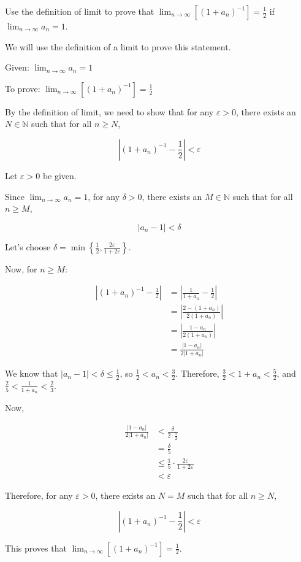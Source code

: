 \begin{exercise}
Use the definition of limit to prove that $\lim_{n \to \infty} \left[\left(1+a_{n}\right)^{-1}\right]=\frac{1}{2}$ if $\lim_{n \to \infty} a_{n}=1$.
\end{exercise}

\begin{solution}
We will use the definition of a limit to prove this statement.

Given: $\lim_{n \to \infty} a_{n}=1$

To prove: $\lim_{n \to \infty} \left[\left(1+a_{n}\right)^{-1}\right]=\frac{1}{2}$

By the definition of limit, we need to show that for any $\varepsilon > 0$, there exists an $N \in \mathbb{N}$ such that for all $n \geq N$,

\[
\left|\left(1+a_{n}\right)^{-1} - \frac{1}{2}\right| < \varepsilon
\]

Let $\varepsilon > 0$ be given.

Since $\lim_{n \to \infty} a_{n}=1$, for any $\delta > 0$, there exists an $M \in \mathbb{N}$ such that for all $n \geq M$,

\[
|a_{n} - 1| < \delta
\]

Let's choose $\delta = \min\left\{\frac{1}{2}, \frac{2\varepsilon}{1+2\varepsilon}\right\}$.

Now, for $n \geq M$:

\begin{align*}
\left|\left(1+a_{n}\right)^{-1} - \frac{1}{2}\right| &= \left|\frac{1}{1+a_{n}} - \frac{1}{2}\right| \\[6pt]
&= \left|\frac{2-(1+a_{n})}{2(1+a_{n})}\right| \\[6pt]
&= \left|\frac{1-a_{n}}{2(1+a_{n})}\right| \\[6pt]
&= \frac{|1-a_{n}|}{2|1+a_{n}|}
\end{align*}

We know that $|a_{n} - 1| < \delta \leq \frac{1}{2}$, so $\frac{1}{2} < a_{n} < \frac{3}{2}$.
Therefore, $\frac{3}{2} < 1+a_{n} < \frac{5}{2}$, and $\frac{2}{5} < \frac{1}{1+a_{n}} < \frac{2}{3}$.

Now,

\begin{align*}
\frac{|1-a_{n}|}{2|1+a_{n}|} &< \frac{\delta}{2 \cdot \frac{5}{2}} \\[6pt]
&= \frac{\delta}{5} \\[6pt]
&\leq \frac{1}{5} \cdot \frac{2\varepsilon}{1+2\varepsilon} \\[6pt]
&< \varepsilon
\end{align*}

Therefore, for any $\varepsilon > 0$, there exists an $N = M$ such that for all $n \geq N$,

\[
\left|\left(1+a_{n}\right)^{-1} - \frac{1}{2}\right| < \varepsilon
\]

This proves that $\lim_{n \to \infty} \left[\left(1+a_{n}\right)^{-1}\right]=\frac{1}{2}$.
\end{solution}



